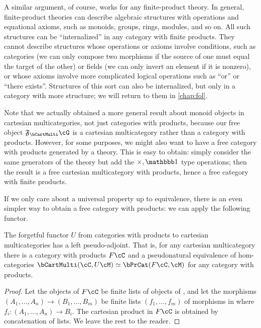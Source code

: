 A similar argument, of course, works for any finite-product theory.
In general, finite-product theories can describe algebraic structures with operations and equational axioms, such as monoids, groups, rings, modules, and so on.
All such structures can be ``internalized'' in any category with finite products.
They cannot describe structures whose operations or axioms involve conditions, such as categories (we can only compose two morphisms if the source of one must equal the target of the other) or fields (we can only invert an element if it is nonzero), or whose axioms involve more complicated logical operations such as ``or'' or ``there exists''.
Structures of this sort can also be internalized, but only in a category with more structure; we will return to them in \cref{chap:fol}.

Note that we actually obtained a more general result about monoid objects in cartesian multicategories, not just categories with products, because our free object $\F\bCartMulti\cG$ is a cartesian multicategory rather than a category with products.
However, for some purposes, we might also want to have a free category with products generated by a theory.
This is easy to obtain: simply consider the same generators of the theory but add the $\times,\unit$ type operations; then the result is a  free cartesian multicategory with products, hence a free category with finite products.

If we only care about a universal property up to equivalence, there is an even simpler way to obtain a free category with products: we can apply the following functor.

\begin{lem}\label{thm:free-catprod-cartmulti}
  The forgetful functor $U$ from categories with products to cartesian multicategories has a left pseudo-adjoint.
  That is, for any cartesian multicategory \cC there is a category with products $F\cC$ and a pseudonatural equivalence of hom-categories $\bCartMulti(\cC,U\cM) \simeq \bPrCat(F\cC,\cM)$ for any category \cM with products.
\end{lem}
\begin{proof}
  Let the objects of $F\cC$ be finite lists of objects of \cC, and let the morphisms $(A_1,\dots,A_n) \to (B_1,\dots, B_m)$ be finite lists $(f_1,\dots, f_m)$ of morphisms in \cC where $f_i : (A_1,\dots,A_n) \to B_i$.
  The cartesian product in $F\cC$ is obtained by concatenation of lists.
  We leave the rest to the reader.
\end{proof}

